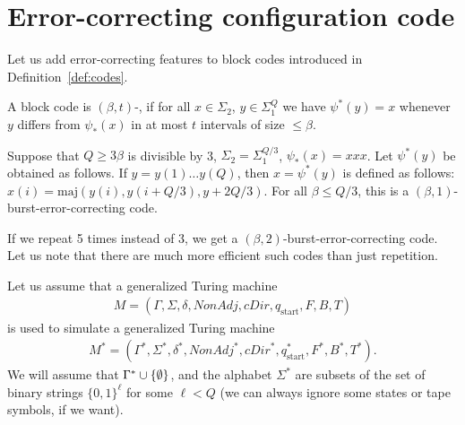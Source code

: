 \documentclass[12pt]{memoir}
\newcommand{\fld}[1]{\ensuremath{\textit{#1}}}
\newcommand{\maj}{\mathrm{maj}}
\renewcommand{\B}{B}
\newcommand{\Tu}{T}
\newcommand{\Tus}{T^{*}}
\newcommand{\Z}{Z}
\newcommand{\cDir}{\fld{cDir}}
\renewcommand{\G}{\fld{NonAdj}} %
\newcommand{\start}{\mathrm{start}}
\begin{document}



\section{Error-correcting configuration code}\label{sec:coding}

Let us add error-correcting features to block codes introduced in
Definition~\ref{def:codes}.

\begin{definition}\label{def:err-code}
A block code is $(\beta,t)$-,
if for all $x\in\Sigma_{2}$, $y\in\Sigma_{1}^{Q}$ we
have $\psi^{*}(y)=x$ whenever $y$ differs from
$\psi_{*}(x)$ in at most $t$ intervals of size $\le\beta$.
\end{definition}

\begin{example}\label{xmp:tripling}
  Suppose that $Q\ge 3\beta$ is divisible by 3,
  $\Sigma_{2}=\Sigma_{1}^{Q/3}$, $\psi_{*}(x)=xxx$.
  Let $\psi^{*}(y)$ be obtained as follows.
  If $y=y(1)\dots y(Q)$, then $x=\psi^{*}(y)$ is defined as follows:
    $x(i)=\maj(y(i),y(i+Q/3),y+2Q/3)$.
    For all $\beta\le Q/3$, this is a
    $(\beta,1)$-burst-error-correcting code.

    If we repeat 5 times instead of 3, we get a $(\beta,2)$-burst-error-correcting
    code.
    Let us note that there are much more efficient such codes than just repetition.
 \end{example}

Let us assume that a generalized Turing machine
\begin{align*}
    M = (\Gamma, \Sigma, \delta, \G, \cDir, q_{\start},F, \B, \Tu)
\end{align*}
is used to simulate a generalized Turing machine
\begin{align*}
M^* = (\Gamma^{*}, \Sigma^{*}, \delta^{*}, \G^{*}, \cDir^{*}, q^{*}_{\start},F^{*}, \B^{*}, \Tus).
\end{align*}
We will assume that $\Gamma^*\cup\mathopen\{\emptyset\mathclose\}$,
and the alphabet $\Sigma^*$ are subsets of the set of  binary strings
$\{0,1\}^{\ell}$ for some $\ell<Q$ (we can always ignore some states or tape
symbols, if we want).
\end{document}
